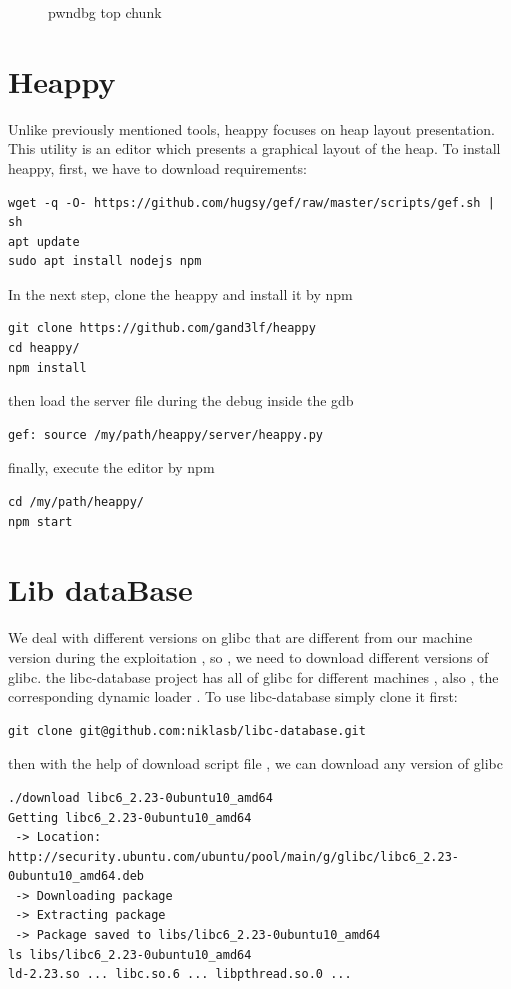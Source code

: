 \documentclass{masterthesis}
\newcommand*\libc{glibc}
\begin{document}
\begin{figure}[h!]
\caption{pwndbg top chunk}
\label{fig:pwntopchunk}
\end{figure}


\section{Heappy}
Unlike previously mentioned tools, heappy focuses on heap layout presentation. This utility is an editor which presents a graphical layout of the heap. To install heappy, first, we have to download requirements:

\begin{lstlisting}[frame=tlrb]
wget -q -O- https://github.com/hugsy/gef/raw/master/scripts/gef.sh | sh
apt update
sudo apt install nodejs npm
\end{lstlisting}

In the next step, clone the heappy and install it by npm

\begin{lstlisting}[frame=tlrb]
git clone https://github.com/gand3lf/heappy
cd heappy/
npm install
\end{lstlisting}

then load the server file during the debug inside the gdb
\begin{lstlisting}[frame=tlrb]
gef: source /my/path/heappy/server/heappy.py
\end{lstlisting}

finally, execute the editor by npm

\begin{lstlisting}[frame=tlrb]
cd /my/path/heappy/
npm start
\end{lstlisting}


\section{Lib dataBase}
We deal with different versions on \libc{} that are different from our machine version during the exploitation , so , we need to download different versions of \libc{}. the libc-database project has all of \libc{} for different machines , also , the corresponding dynamic loader . To use libc-database simply clone it first:
\begin{lstlisting}[frame=tlrb]
git clone git@github.com:niklasb/libc-database.git
\end{lstlisting}
then with the help of download script file , we can download any version of \libc{}
\begin{lstlisting}[frame=tlrb]
./download libc6_2.23-0ubuntu10_amd64
Getting libc6_2.23-0ubuntu10_amd64
 -> Location: http://security.ubuntu.com/ubuntu/pool/main/g/glibc/libc6_2.23-0ubuntu10_amd64.deb
 -> Downloading package
 -> Extracting package
 -> Package saved to libs/libc6_2.23-0ubuntu10_amd64
ls libs/libc6_2.23-0ubuntu10_amd64
ld-2.23.so ... libc.so.6 ... libpthread.so.0 ...
\end{lstlisting}
\end{document}
